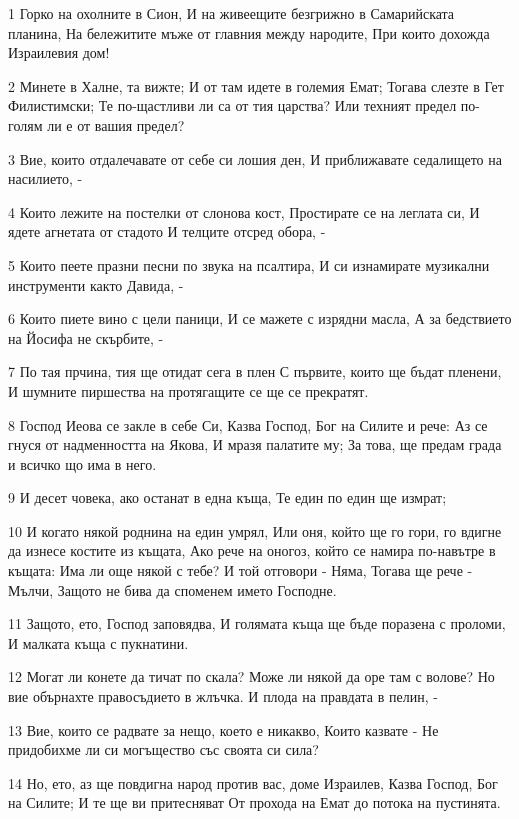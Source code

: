 \par 1 Горко на охолните в Сион, И на живеещите безгрижно в Самарийската планина, На бележитите мъже от главния между народите, При които дохожда Израилевия дом!
\par 2 Минете в Халне, та вижте; И от там идете в големия Емат; Тогава слезте в Гет Филистимски; Те по-щастливи ли са от тия царства? Или техният предел по-голям ли е от вашия предел?
\par 3 Вие, които отдалечавате от себе си лошия ден, И приближавате седалището на насилието, -
\par 4 Които лежите на постелки от слонова кост, Простирате се на леглата си, И ядете агнетата от стадото И телците отсред обора, -
\par 5 Които пеете празни песни по звука на псалтира, И си изнамирате музикални инструменти както Давида, -
\par 6 Които пиете вино с цели паници, И се мажете с изрядни масла, А за бедствието на Йосифа не скърбите, -
\par 7 По тая прчина, тия ще отидат сега в плен С първите, които ще бъдат пленени, И шумните пиршества на протягащите се ще се прекратят.
\par 8 Господ Иеова се закле в себе Си, Казва Господ, Бог на Силите и рече: Аз се гнуся от надменността на Якова, И мразя палатите му; За това, ще предам града и всичко що има в него.
\par 9 И десет човека, ако останат в една къща, Те един по един ще измрат;
\par 10 И когато някой роднина на един умрял, Или оня, който ще го гори, го вдигне да изнесе костите из къщата, Ако рече на оногоз, който се намира по-навътре в къщата: Има ли още някой с тебе? И той отговори - Няма, Тогава ще рече - Мълчи, Защото не бива да споменем името Господне.
\par 11 Защото, ето, Господ заповядва, И голямата къща ще бъде поразена с проломи, И малката къща с пукнатини.
\par 12 Могат ли конете да тичат по скала? Може ли някой да оре там с волове? Но вие обърнахте правосъдието в жлъчка. И плода на правдата в пелин, -
\par 13 Вие, които се радвате за нещо, което е никакво, Които казвате - Не придобихме ли си могъщество със своята си сила?
\par 14 Но, ето, аз ще повдигна народ против вас, доме Израилев, Казва Господ, Бог на Силите; И те ще ви притесняват От прохода на Емат до потока на пустинята.

